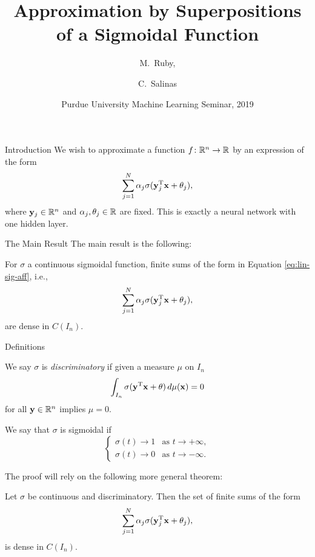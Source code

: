 \documentclass[11pt,letterpaper]{beamer}
\title[Approximation by a Sigmoidal Function] 
{Approximation by Superpositions of a Sigmoidal Function}
\author[M.\ Ruby, C.\ Salinas] 
{M.\ Ruby,%
  \and C.\ Salinas%
}
\institute[Purdue University] %
{
  Department of Mathematics\\
  Purdue University
 }
\date[Spring 2019] %
{Purdue University Machine Learning Seminar, 2019}
\begin{document}
\frame{\titlepage}

\begin{frame}{Introduction}
  We wish to approximate a function $f\colon\mathbb{R}^n\to\mathbb{R}$ by an expression of
  the form
  \begin{equation}
    \label{eq:lin-sig-aff}
    \sum_{j=1}^N \alpha_j\sigma(\mathbf{y}_j^{\mathrm{T}}\mathbf{x}+\theta_j),
  \end{equation}
  where $\mathbf{y}_j\in\mathbb{R}^n$ and $\alpha_j,\theta_j\in\mathbb{R}$ are fixed. This is exactly
  a neural network with one hidden layer.
\end{frame}

\begin{frame}{The Main Result}
  The main result is the following:
  \begin{theorem}
    For $\sigma$ a continuous sigmoidal function, finite sums of the form in
    Equation \eqref{eq:lin-sig-aff}, i.e.,
    \[
      \sum_{j=1}^N \alpha_j\sigma(\mathbf{y}_j^{\mathrm{T}}\mathbf{x}+\theta_j),
    \]
  are dense in $C(I_n)$.
  \end{theorem}
\end{frame}

\begin{frame}{Definitions}
  \begin{definition}
    We say $\sigma$ is \emph{discriminatory} if given a measure $\mu$ on $I_n$
    \[
      \int_{I_n}\sigma(\mathbf{y}^{\mathrm{T}}\mathbf{x}+\theta)\mathop{}\!d\mu(\mathbf{x})=0
    \]
    for all $\mathbf{y}\in\mathbb{R}^n$ implies $\mu=0$.
  \end{definition}
  \begin{definition}
    We say that $\sigma$ is sigmoidal if
    \[
      \begin{cases}
        \sigma(t)\to 1&\text{as }t\to +\infty,\\
        \sigma(t)\to 0&\text{as }t\to -\infty.
      \end{cases}
    \]
  \end{definition}
\end{frame}

\begin{frame}
  The proof will rely on the following more general theorem:
  \begin{theorem}
    Let $\sigma$ be continuous and discriminatory. Then the set of finite sums
    of the form
    \[
      \sum_{j=1}^N \alpha_j\sigma(\mathbf{y}_j^{\mathrm{T}}\mathbf{x}+\theta_j),
    \]
    is dense in $C(I_n)$.
  \end{theorem}
\end{frame}
\end{document}
